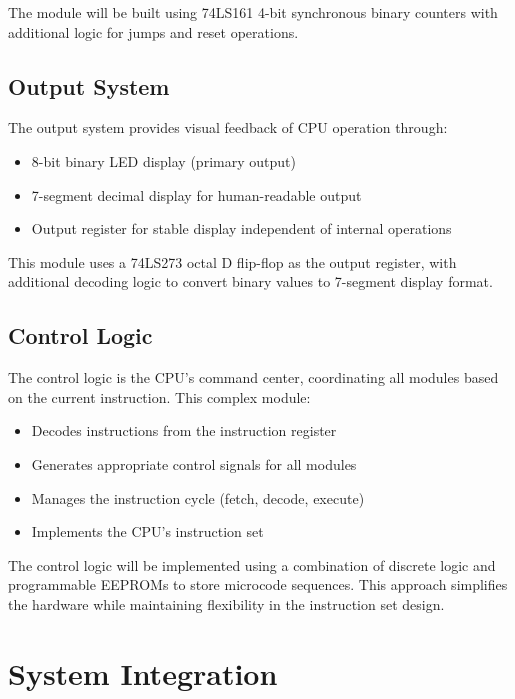 \documentclass[a4paper,12pt]{article}
\begin{document}
The module will be built using 74LS161 4-bit synchronous binary counters with additional logic for jumps and reset operations.

\subsection{Output System}

The output system provides visual feedback of CPU operation through:

\begin{itemize}
    \item 8-bit binary LED display (primary output)
    \item 7-segment decimal display for human-readable output
    \item Output register for stable display independent of internal operations
\end{itemize}

This module uses a 74LS273 octal D flip-flop as the output register, with additional decoding logic to convert binary values to 7-segment display format.

\subsection{Control Logic}

The control logic is the CPU's command center, coordinating all modules based on the current instruction. This complex module:

\begin{itemize}
    \item Decodes instructions from the instruction register
    \item Generates appropriate control signals for all modules
    \item Manages the instruction cycle (fetch, decode, execute)
    \item Implements the CPU's instruction set
\end{itemize}

The control logic will be implemented using a combination of discrete logic and programmable EEPROMs to store microcode sequences. This approach simplifies the hardware while maintaining flexibility in the instruction set design.

\section{System Integration}
\end{document}
